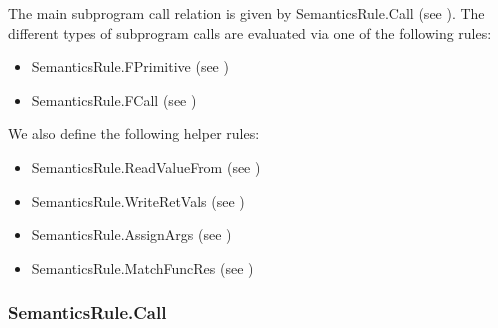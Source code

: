 The main subprogram call relation is given by
SemanticsRule.Call (see ).
%
The different types of subprogram calls are evaluated via one of the following rules:
\begin{itemize}
\item SemanticsRule.FPrimitive (see )
\item SemanticsRule.FCall (see )
\end{itemize}

We also define the following helper rules:
\begin{itemize}
  \item SemanticsRule.ReadValueFrom (see )
  \item SemanticsRule.WriteRetVals (see )
  \item SemanticsRule.AssignArgs (see )
  \item SemanticsRule.MatchFuncRes (see )
\end{itemize}

\subsubsection{SemanticsRule.Call\label{sec:SemanticsRule.Call}}
